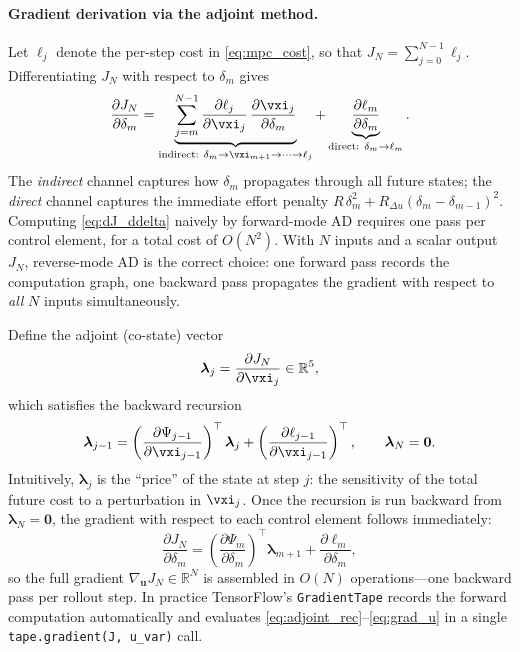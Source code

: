 \paragraph{Gradient derivation via the adjoint method.}
\label{sec:adjoint}
Let $\ell_j$ denote the per-step cost in \eqref{eq:mpc_cost}, so that
$J_N = \sum_{j=0}^{N-1} \ell_j$.
Differentiating $J_N$ with respect to $\delta_m$ gives
\begin{equation}
  \frac{\partial J_N}{\partial \delta_m}
  = \underbrace{\sum_{j=m}^{N-1}
    \frac{\partial \ell_j}{\partial \vxi_j}\,
    \frac{\partial \vxi_j}{\partial \delta_m}}_{\text{indirect: }\delta_m \to \vxi_{m+1} \to \cdots \to \ell_j}
    + \underbrace{\frac{\partial \ell_m}{\partial \delta_m}}_{\text{direct: }\delta_m \to \ell_m}.
  \label{eq:dJ_ddelta}
\end{equation}
The \emph{indirect} channel captures how $\delta_m$ propagates through all
future states; the \emph{direct} channel captures the immediate effort penalty
$R\,\delta_m^2 + R_{\Delta u}(\delta_m - \delta_{m-1})^2$.
Computing \eqref{eq:dJ_ddelta} naively by forward-mode AD requires one pass per
control element, for a total cost of $O(N^2)$.
With $N$ inputs and a scalar output $J_N$, reverse-mode AD is the correct
choice: one forward pass records the computation graph, one backward pass
propagates the gradient with respect to \emph{all} $N$ inputs simultaneously.

Define the adjoint (co-state) vector
\begin{equation}
  \boldsymbol{\lambda}_j = \frac{\partial J_N}{\partial \vxi_j} \in \mathbb{R}^5,
  \label{eq:costate}
\end{equation}
which satisfies the backward recursion
\begin{equation}
  \boldsymbol{\lambda}_{j-1}
  = \left(\frac{\partial \Psi_{j-1}}{\partial \vxi_{j-1}}\right)^\top \boldsymbol{\lambda}_j
    + \left(\frac{\partial \ell_{j-1}}{\partial \vxi_{j-1}}\right)^\top,
  \qquad
  \boldsymbol{\lambda}_{N} = \mathbf{0}.
  \label{eq:adjoint_rec}
\end{equation}
Intuitively, $\boldsymbol{\lambda}_j$ is the ``price'' of the state at step
$j$: the sensitivity of the total future cost to a perturbation in $\vxi_j$.
Once the recursion is run backward from $\boldsymbol{\lambda}_N = \mathbf{0}$,
the gradient with respect to each control element follows immediately:
\begin{equation}
  \frac{\partial J_N}{\partial \delta_m}
  = \left(\frac{\partial \Psi_m}{\partial \delta_m}\right)^\top \boldsymbol{\lambda}_{m+1}
    + \frac{\partial \ell_m}{\partial \delta_m},
  \label{eq:grad_u}
\end{equation}
so the full gradient $\nabla_{\mathbf{u}} J_N \in \mathbb{R}^N$ is assembled
in $O(N)$ operations---one backward pass per rollout step.
In practice TensorFlow's \texttt{GradientTape} records the forward computation
automatically and evaluates \eqref{eq:adjoint_rec}--\eqref{eq:grad_u} in a
single \texttt{tape.gradient(J, u\_var)} call.


